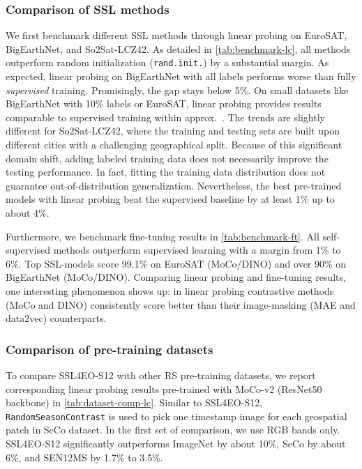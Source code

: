 \documentclass[lettersize,journal]{IEEEtran}
\begin{document}
\subsubsection{Comparison of SSL methods} We first benchmark different SSL methods through linear probing on EuroSAT, BigEarthNet, and So2Sat-LCZ42. As detailed in \cref{tab:benchmark-lc}, all methods outperform random initialization (\texttt{rand.init.}) by a substantial margin.
As expected, linear probing on BigEarthNet with all labels performs worse than fully \textit{supervised} training. Promisingly, the gap stays below 5\%. On small datasets like BigEarthNet with 10\% labels or EuroSAT, linear probing provides results comparable to supervised training within approx.\ . 
The trends are slightly different for So2Sat-LCZ42, where the training and testing sets are built upon different cities with a challenging geographical split. Because of this significant domain shift, adding labeled training data does not necessarily improve the testing performance. In fact, fitting the training data distribution does not guarantee out-of-distribution generalization. Nevertheless, the best pre-trained models with linear probing beat the supervised baseline by at least 1\% up to about 4\%.

Furthermore, we benchmark fine-tuning results in \cref{tab:benchmark-ft}. All self-supervised methods outperform supervised learning with a margin from 1\% to 6\%. Top SSL-models score 99.1\% on EuroSAT (MoCo/DINO) and over 90\% on BigEarthNet (MoCo/DINO). Comparing linear probing and fine-tuning results, one interesting phenomenon shows up: in linear probing contrastive methods (MoCo and DINO) consistently score better than their image-masking (MAE and data2vec) counterparts.



\subsubsection{Comparison of pre-training datasets} To compare SSL4EO-S12 with other RS pre-training datasets, we report corresponding linear probing results pre-trained with MoCo-v2 (ResNet50 backbone) in \cref{tab:dataset-comp-lc}. Similar to SSL4EO-S12, \texttt{RandomSeasonContrast} is used to pick one timestamp image for each geospatial patch in SeCo dataset. In the first set of comparison, we use RGB bands only. SSL4EO-S12 significantly outperforms ImageNet by about 10\%, SeCo by about 6\%, and SEN12MS by 1.7\% to 3.5\%.
\end{document}
